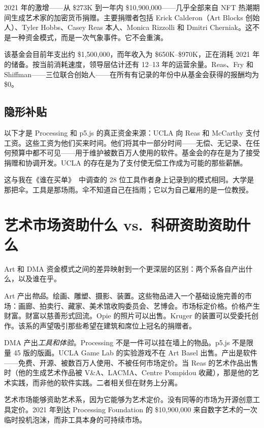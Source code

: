 \documentclass[10pt,letterpaper,twocolumn]{article}
\newcommand{\dma}{\textsc{DMA}}
\begin{document}
2021 年的激增——从 \$273K 到一年内 \$10{,}900{,}000——几乎全部来自 NFT 热潮期间生成艺术家的加密货币捐赠。主要捐赠者包括 Erick Calderon（Art Blocks 创始人）、Tyler Hobbs、Casey Reas 本人、Monica Rizzolli 和 Dmitri Cherniak。这不是一种资金模式，而是一次气象事件。它不会重演。

该基金会目前年支出约 \$1{,}500{,}000，而年收入为 \$650K--\$970K，正在消耗 2021 年的储备。按当前消耗速度，领导层估计还有 12--13 年的运营余量。Reas、Fry 和 Shiffman——三位联合创始人——在所有有记录的年份中从基金会获得的报酬均为 \$0。

\subsection{隐形补贴}

以下才是 Processing 和 p5.js 的真正资金来源：UCLA 向 Reas 和 McCarthy 支付工资。这些工资为他们买来时间。他们将其中一部分时间——无偿、无记录、在任何预算中都不可见——用于维护被数百万人使用的软件。基金会的存在是为了接受捐赠和协调开发。UCLA 的存在是为了支付使无偿工作成为可能的那些薪酬。

这与我在《谁在买单》~\citep{scudder2026sustainability}中调查的 28 位工具作者身上记录到的模式相同。大学是那把伞。工具是那场雨。伞不知道自己在挡雨；它以为自己雇用的是一位教授。

\section{艺术市场资助什么 vs.\ 科研资助资助什么}

Art 和 \dma{} 资金模式之间的差异映射到一个更深层的区别：两个系各自产出什么，以及谁在乎。

Art 产出\emph{物品}。绘画、雕塑、摄影、装置。这些物品进入一个基础设施完善的市场：画廊、拍卖行、藏家、美术馆收购委员会、艺博会。市场标定价格。价格产生财富。财富以慈善形式回流。Opie 的照片可以出售。Kruger 的装置可以受委托创作。该系的声望吸引那些希望在建筑和席位上冠名的捐赠者。

\dma{} 产出\emph{工具和体验}。Processing 不是一件可以挂在墙上的物品。p5.js 不是限量 45 版的版画。UCLA Game Lab 的实验游戏不在 Art Basel 出售。产出是软件——免费、开源、被数百万人使用、不被任何市场定价。当 Reas 的艺术作品出售时（他的生成艺术作品被 V\&A、LACMA、Centre Pompidou 收藏），那是他的艺术实践，而非他的软件实践。二者相关但在财务上分离。

艺术市场能够资助艺术系，因为它能够为艺术定价。没有同等的市场为开源创意工具定价。2021 年到达 Processing Foundation 的 \$10{,}900{,}000 来自数字艺术的一次临时投机泡沫，而非工具本身的可持续市场。
\end{document}
